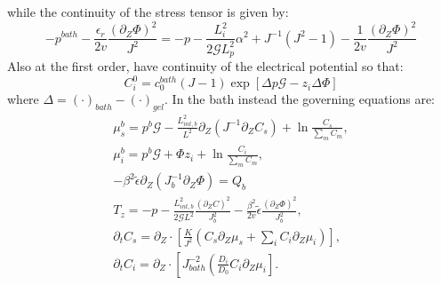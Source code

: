 while the continuity of the stress tensor is given by:
\begin{equation}
-p^{bath}-\frac{\epsilon_r}{2v}\frac{(\partial_Z \Phi)^2}{J^2}=-p - \frac{L^2_i}{2\mathcal{G}L_p^2} \alpha^2 + J^{-1}\left(J^2-1\right)-\frac{1}{2v}\frac{(\partial_Z \Phi)^2}{J^2}
\end{equation}
Also at the first order, have continuity of the electrical potential so that:
\begin{equation}
C^0_i = c^{bath}_0(J-1) \exp\left[\Delta p\mathcal{G}-z_i\Delta \Phi\right]
\end{equation}
where $\Delta=(\cdot)_{bath}-(\cdot)_{gel}$.
In the bath instead the governing equations are:
\begin{gather}
\mu^{b}_s = p^b \mathcal{G} - \frac{L^2_{int,b}}{L^2}  \partial_Z (J^{-1} \partial_Z C_s) + \ln \frac{C_s}{\sum_m C_m}, \\
\mu^{b}_i = p^b \mathcal{G}+ \Phi z_i + \ln \frac{C_i}{\sum_m C_m} ,\\
-\beta^2 \tilde{\epsilon} \partial_Z (J_b^{-1}\partial_Z\Phi) = Q_b\, \\[2.5mm]
T_z= -p - \frac{L^2_{int,b}}{2\mathcal{G}L^2} \frac{(\partial_Z C)^2}{J_{b}^2}-\frac{\beta^2}{2v}\tilde{\epsilon} \frac{(\partial_Z \Phi)^2}{J_b^2},\\
\partial_t C_s=\partial_Z \cdot\left[\frac{K}{J^2} \left(C_s\partial_Z \mu_s +\sum_i  C_i \partial_Z \mu_i\right)\right],\\
\partial_t C_i= \partial_Z \cdot\left[ J_{bath}^{-2} \left(\frac{D_i}{D_0}C_i\partial_Z \mu_i\right].
\end{gather}